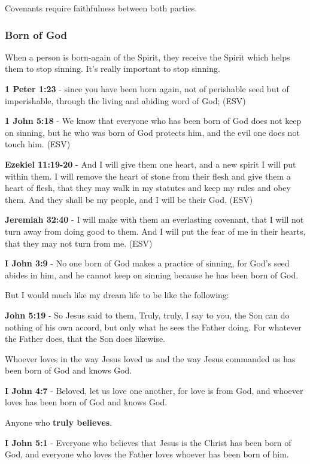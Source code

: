 \documentclass[11pt]{article}
\begin{document}
Covenants require faithfulness between both parties.

\subsubsection{Born of God}
\label{sec:org09426ae}
When a person is born-again of the Spirit, they receive the Spirit which helps them to stop sinning. It's really important to stop sinning.

\textbf{1 Peter 1:23} - since you have been born again, not of perishable seed but of imperishable, through the living and abiding word of God; (ESV)

\textbf{1 John 5:18} - We know that everyone who has been born of God does not keep on sinning, but he who was born of God protects him, and the evil one does not touch him. (ESV)

\textbf{Ezekiel 11:19-20} - And I will give them one heart, and a new spirit I will put within them. I will remove the heart of stone from their flesh and give them a heart of flesh, that they may walk in my statutes and keep my rules and obey them. And they shall be my people, and I will be their God. (ESV)

\textbf{Jeremiah 32:40} - I will make with them an everlasting covenant, that I will not turn away from doing good to them. And I will put the fear of me in their hearts, that they may not turn from me. (ESV)

\textbf{I John 3:9} - No one born of God makes a practice of sinning, for God's seed abides in him, and he cannot keep on sinning because he has been born of God.

But I would much like my dream life to be like the following:

\textbf{John 5:19} - So Jesus said to them, Truly, truly, I say to you, the Son can do nothing of his own accord, but only what he sees the Father doing. For whatever the Father does, that the Son does likewise.

Whoever loves in the way Jesus loved us and the way Jesus commanded us has been born of God and knows God.

\textbf{I John 4:7} - Beloved, let us love one another, for love is from God, and whoever loves has been born of God and knows God.

Anyone who \textbf{truly believes}.

\textbf{I John 5:1} - Everyone who believes that Jesus is the Christ has been born of God, and everyone who loves the Father loves whoever has been born of him.
\end{document}
